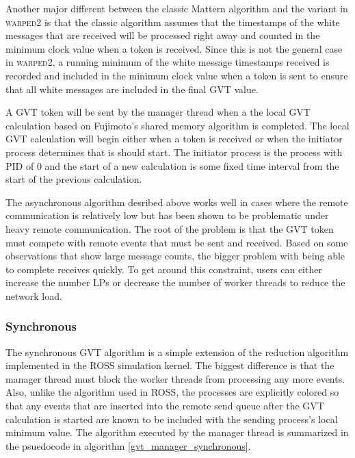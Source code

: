 \documentclass[11pt]{book}
\begin{document}
Another major different between the classic Mattern algorithm and the variant in \textsc{warped2}
is that the classic algorithm assumes that the timestamps of the white messages that are received
will be processed right away and counted in the minimum clock value when a token is received.
Since this is not the general case in \textsc{warped2}, a running minimum of the white message
timestamps received is recorded and included in the minimum clock value when a token is sent to
ensure that all white messages are included in the final GVT value.

A GVT token will be sent by the manager thread when a the local GVT calculation based on
Fujimoto's shared memory algorithm is completed.  The local GVT calculation will begin either
when a token is received or when the initiator process determines that is should start.  The
initiator process is the process with PID of 0 and the start of a new calculation is some fixed
time interval from the start of the previous calculation.  

The asynchronous algorithm desribed above works well in cases where the remote communication is
relatively low but has been shown to be problematic under heavy remote communication.
The root of the problem is that the GVT token must compete with remote events that must be
sent and received.  Based on some observations that show large message counts, the bigger problem
with being able to complete receives quickly.  To get around this constraint, users can either
increase the number LPs or decrease the number of worker threads to reduce the network load.

\subsubsection{Synchronous}

The synchronous GVT algorithm is a simple extension of the reduction algorithm implemented
in the ROSS simulation kernel.  The biggest difference is that the manager thread must block
the worker threads from processing any more events.  Also, unlike the algorithm used in ROSS,
the processes are explicitly colored so that any events that are inserted into the remote send
queue after the GVT calculation is started are known to be included with the sending process's
local minimum value.  The algorithm executed by the manager thread is summarized in the psuedocode
in algorithm \ref{gvt_manager_synchronous}.
\end{document}

